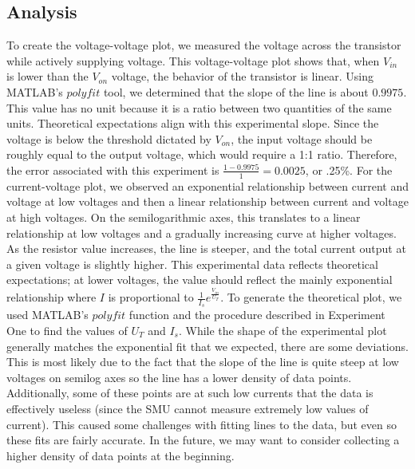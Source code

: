 \documentclass{article}
\begin{document}
\subsection{Analysis}
To create the voltage-voltage plot, we measured the voltage across the transistor while actively supplying voltage. This voltage-voltage plot shows that, when $V_{in}$ is lower than the $V_{on}$ voltage, the behavior of the transistor is linear. Using MATLAB's $polyfit$ tool, we determined that the slope of the line is about $0.9975$. This value has no unit because it is a ratio between two quantities of the same units. Theoretical expectations align with this experimental slope. Since the voltage is below the threshold dictated by $V_{on}$, the input voltage should be roughly equal to the output voltage, which would require a 1:1 ratio. 
Therefore, the error associated with this experiment is $\frac{1 - 0.9975}{1} = 0.0025$, or .25\%.
\newline
\newline
For the current-voltage plot, we observed an exponential relationship between current and voltage at low voltages and then a linear relationship between current and voltage at high voltages. On the semilogarithmic axes, this translates to a linear relationship at low voltages and a gradually increasing curve at higher voltages. As the resistor value increases, the line is steeper, and the total current output at a given voltage is slightly higher.
This experimental data reflects theoretical expectations; at lower voltages, the value should reflect the mainly exponential relationship where $I$ is proportional to $\frac{1}{I_s}e^{\frac{V_{in}}{U_T}}$. To generate the theoretical plot, we used MATLAB's $polyfit$ function and the procedure described in Experiment One to find the values of $U_T$ and $I_s$. 
While the shape of the experimental plot generally matches the exponential fit that we expected, there are some deviations. This is most likely due to the fact that the slope of the line is quite steep at low voltages on semilog axes so the line has a lower density of data points. Additionally, some of these points are at such low currents that the data is effectively useless (since the SMU cannot measure extremely low values of current). This caused some challenges with fitting lines to the data, but even so these fits are fairly accurate. In the future, we may want to consider collecting a higher density of data points at the beginning.
\newline 
\newline
\end{document}

